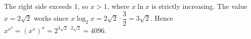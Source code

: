 The right side exceeds 1, so $x>1$, where $x\ln x$ is strictly increasing. The value $x=2\sqrt2$ works since $x \log_2 x = 2 \sqrt{2} \cdot \dfrac{3}{2} = 3 \sqrt{2}$. Hence $x^{x^2}=(x^x)^x=2^{3\sqrt2\cdot2\sqrt2}=\boxed{4096}$.
